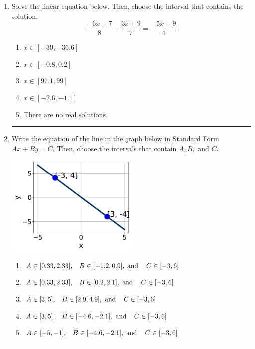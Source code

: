 \documentclass[14pt]{extbook}
\newcommand{\litem}[1]{\item#1\hspace*{-1cm}\rule{\textwidth}{0.4pt}}
\begin{document}
\begin{enumerate}
\litem{
Solve the linear equation below. Then, choose the interval that contains the solution.\[ \frac{-6x -7}{8} - \frac{3x + 9}{7} = \frac{-5x -9}{4} \]\begin{enumerate}[label=\Alph*.]
\item \( x \in [-39, -36.6] \)
\item \( x \in [-0.8, 0.2] \)
\item \( x \in [97.1, 99] \)
\item \( x \in [-2.6, -1.1] \)
\item \( \text{There are no real solutions.} \)

\end{enumerate} }
\litem{
Write the equation of the line in the graph below in Standard Form $Ax+By=C$. Then, choose the intervals that contain $A, B, \text{ and } C$.
\begin{center}
    \includegraphics[width=0.5\textwidth]{../Figures/linearGraphToStandardCopyC.png}
\end{center}
\begin{enumerate}[label=\Alph*.]
\item \( A \in [0.33, 2.33], \hspace{3mm} B \in [-1.2, 0.9], \text{ and } \hspace{3mm} C \in [-3, 6] \)
\item \( A \in [0.33, 2.33], \hspace{3mm} B \in [0.2, 2.1], \text{ and } \hspace{3mm} C \in [-3, 6] \)
\item \( A \in [3, 5], \hspace{3mm} B \in [2.9, 4.9], \text{ and } \hspace{3mm} C \in [-3, 6] \)
\item \( A \in [3, 5], \hspace{3mm} B \in [-4.6, -2.1], \text{ and } \hspace{3mm} C \in [-3, 6] \)
\item \( A \in [-5, -1], \hspace{3mm} B \in [-4.6, -2.1], \text{ and } \hspace{3mm} C \in [-3, 6] \)


\end{enumerate}}
\end{enumerate}
\end{document}

